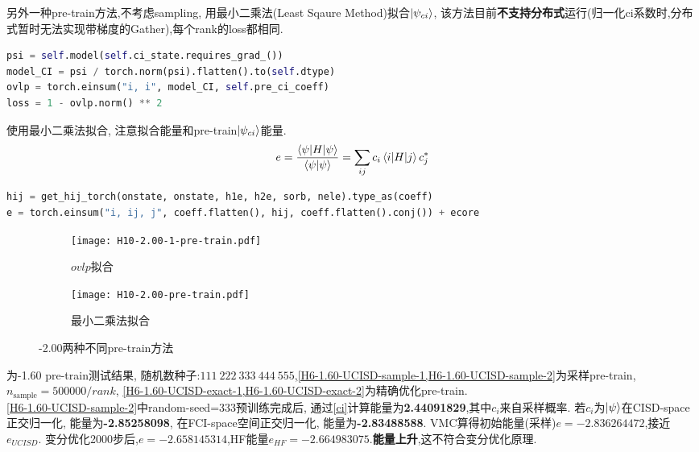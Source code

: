 另外一种pre-train方法,不考虑sampling, 用最小二乘法(Least Sqaure Method)拟合$\ket{\psi_{ci}}$,
该方法目前\textbf{不支持分布式}运行(归一化ci系数时,分布式暂时无法实现带梯度的Gather),每个rank的loss都相同.
\begin{lstlisting}[language=Python]
psi = self.model(self.ci_state.requires_grad_())
model_CI = psi / torch.norm(psi).flatten().to(self.dtype)
ovlp = torch.einsum("i, i", model_CI, self.pre_ci_coeff)
loss = 1 - ovlp.norm() ** 2
\end{lstlisting}
使用最小二乘法拟合,
注意拟合能量和pre-train$\ket{\psi_{ci}}$能量.
\begin{equation}
    e = \frac{\braket{\psi|H|\psi}}{\braket{\psi|\psi}} = \sum_{ij}c_i\braket{i|H|j}c_j^*
    \label{ci}
\end{equation}

\begin{lstlisting}[language=Python]
hij = get_hij_torch(onstate, onstate, h1e, h2e, sorb, nele).type_as(coeff)
e = torch.einsum("i, ij, j", coeff.flatten(), hij, coeff.flatten().conj()) + ecore
\end{lstlisting}

\begin{figure}[htp]
    \begin{subfigure}[b]{0.48\textwidth}
        \centering
        \texttt{[image: H10-2.00-1-pre-train.pdf]}
        \caption{$ovlp$拟合}
    \end{subfigure}
    \begin{subfigure}[b]{0.48\textwidth}
        \centering
        \texttt{[image: H10-2.00-pre-train.pdf]}
        \caption{最小二乘法拟合}
    \end{subfigure}
    \caption{-2.00两种不同pre-train方法}
\end{figure}

为-1.60 pre-train测试结果,
随机数种子:$111\ 222\ 333\ 444\ 555$,\cref{H6-1.60-UCISD-sample-1,H6-1.60-UCISD-sample-2}为采样pre-train,
$n_\mathrm{sample}=500000/rank$,
\cref{H6-1.60-UCISD-exact-1,H6-1.60-UCISD-exact-2}为精确优化pre-train.\\
\indent \cref{H6-1.60-UCISD-sample-2}中random-seed=333预训练完成后, 通过\cref{ci}计算能量为\textbf{2.44091829},其中$c_i$来自采样概率. 
若$c_i$为$\ket{\psi}$在CISD-space正交归一化, 能量为\textbf{-2.85258098},
在FCI-space空间正交归一化, 能量为\textbf{-2.83488588}.
VMC算得初始能量(采样)$e=-2.836264472$,接近$e_{UCISD}$.
变分优化2000步后,$e=-2.658145314$,HF能量$e_{HF}=-2.664983075$.\textbf{能量上升},这不符合变分优化原理.


